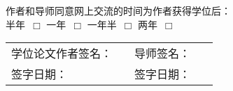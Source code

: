 {\begin{titlepage}
\begin{flushleft}
        \vspace{15pt}

    \hspace{0.85cm} 作者和导师同意网上交流的时间为作者获得学位后：\\
        \vspace{15pt}
    \hspace{0.85cm} 半年~$\Box$ \hspace{1cm} 一年~$\Box$ \hspace{1cm} 一年半~$\Box$ \hspace{1cm} 两年~$\Box$
    \end{flushleft}
    \vspace{0.7cm}
\noindent
    \begin{tabular}{llll}
      学位论文作者签名： & \hspace{2.5cm} & 导师签名： & ~ \\
      签字日期： & \hfill & 签字日期： & ~ \\
    \end{tabular}
    \cleardoublepage
  \end{titlepage}
}

